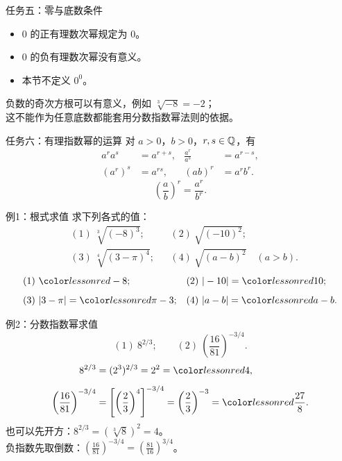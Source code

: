 \documentclass[aspectratio=169,10pt]{beamer}
\begin{document}
\begin{frame}[t]{任务五：零与底数条件}
 \begin{itemize}
  \item $0$ 的正有理数次幂规定为 $0$。
  \item $0$ 的负有理数次幂没有意义。
  \item 本节不定义 $0^0$。
 \end{itemize}
 \pause
 \gap
 \gap
 负数的奇次方根可以有意义，例如 $\sqrt[3]{-8}=-2$；\\
 这不能作为任意底数都能套用分数指数幂法则的依据。
\end{frame}

\begin{frame}[t]{任务六：有理指数幂的运算}
 对 $a>0$，$b>0$，$r,s\in\mathbb Q$，有
 \begin{align*}
  a^r a^s&=a^{r+s},& \frac{a^r}{a^s}&=a^{r-s},\\[.7em]
  (a^r)^s&=a^{rs},& (ab)^r&=a^r b^r.
 \end{align*}
 \pause
 \[\left(\frac ab\right)^r=\frac{a^r}{b^r}.\]
 \gap
\end{frame}

\begin{frame}[t]{例1：根式求值}
 求下列各式的值：
 \begin{align*}
  &(1)\ \sqrt[3]{(-8)^3}; &&(2)\ \sqrt{(-10)^2};\\[.5em]
  &(3)\ \sqrt[4]{(3-\pi)^4}; &&(4)\ \sqrt{(a-b)^2}\quad(a>b).
 \end{align*}
 \pause
 \begin{align*}
  &(1)\ \ans{-8}; &&(2)\ |-10|=\ans{10};\\[.5em]
  &(3)\ |3-\pi|=\ans{\pi-3}; &&(4)\ |a-b|=\ans{a-b}.
 \end{align*}
\end{frame}

\begin{frame}[t]{例2：分数指数幂求值}
 \[(1)\ 8^{2/3};\qquad (2)\ \left(\frac{16}{81}\right)^{-3/4}.\]
 \pause
 \begin{align*}
  8^{2/3}&=(2^3)^{2/3}=2^2=\ans4,\\[.5em]
  \left(\frac{16}{81}\right)^{-3/4}
   &=\left[\left(\frac23\right)^4\right]^{-3/4}
     =\left(\frac23\right)^{-3}=\ans{\frac{27}8}.
 \end{align*}
 \pause
 也可以先开方：$8^{2/3}=(\sqrt[3]8)^2=4$。\\
 负指数先取倒数：$\left(\frac{16}{81}\right)^{-3/4}=\left(\frac{81}{16}\right)^{3/4}$。
\end{frame}
\end{document}
